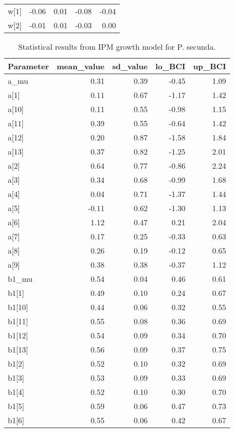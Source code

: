 \documentclass[12pt,]{article}
\begin{document}
\begin{table}[ht]
{\begin{tabular}{lrrrr}
  w[1] & -0.06 & 0.01 & -0.08 & -0.04 \\ 
  w[2] & -0.01 & 0.01 & -0.03 & 0.00 \\ 
   \hline
\end{tabular}
}
\end{table}\begin{table}[ht]
\centering
\caption{Statistical results from IPM growth model for P. secunda.} 
{\footnotesize
\begin{tabular}{lrrrr}
  \hline
Parameter & mean\_value & sd\_value & lo\_BCI & up\_BCI \\ 
  \hline
a\_mu & 0.31 & 0.39 & -0.45 & 1.09 \\ 
  a[1] & 0.11 & 0.67 & -1.17 & 1.42 \\ 
  a[10] & 0.11 & 0.55 & -0.98 & 1.15 \\ 
  a[11] & 0.39 & 0.55 & -0.64 & 1.42 \\ 
  a[12] & 0.20 & 0.87 & -1.58 & 1.84 \\ 
  a[13] & 0.37 & 0.82 & -1.25 & 2.01 \\ 
  a[2] & 0.64 & 0.77 & -0.86 & 2.24 \\ 
  a[3] & 0.34 & 0.68 & -0.99 & 1.68 \\ 
  a[4] & 0.04 & 0.71 & -1.37 & 1.44 \\ 
  a[5] & -0.11 & 0.62 & -1.30 & 1.13 \\ 
  a[6] & 1.12 & 0.47 & 0.21 & 2.04 \\ 
  a[7] & 0.17 & 0.25 & -0.33 & 0.63 \\ 
  a[8] & 0.26 & 0.19 & -0.12 & 0.65 \\ 
  a[9] & 0.38 & 0.38 & -0.37 & 1.12 \\ 
  b1\_mu & 0.54 & 0.04 & 0.46 & 0.61 \\ 
  b1[1] & 0.49 & 0.10 & 0.24 & 0.67 \\ 
  b1[10] & 0.44 & 0.06 & 0.32 & 0.55 \\ 
  b1[11] & 0.55 & 0.08 & 0.36 & 0.69 \\ 
  b1[12] & 0.54 & 0.09 & 0.34 & 0.70 \\ 
  b1[13] & 0.56 & 0.09 & 0.37 & 0.75 \\ 
  b1[2] & 0.52 & 0.10 & 0.32 & 0.69 \\ 
  b1[3] & 0.53 & 0.09 & 0.33 & 0.69 \\ 
  b1[4] & 0.52 & 0.10 & 0.30 & 0.70 \\ 
  b1[5] & 0.59 & 0.06 & 0.47 & 0.73 \\ 
  b1[6] & 0.55 & 0.06 & 0.42 & 0.67 \\ 

\end{tabular}}
\end{table}
\end{document}
